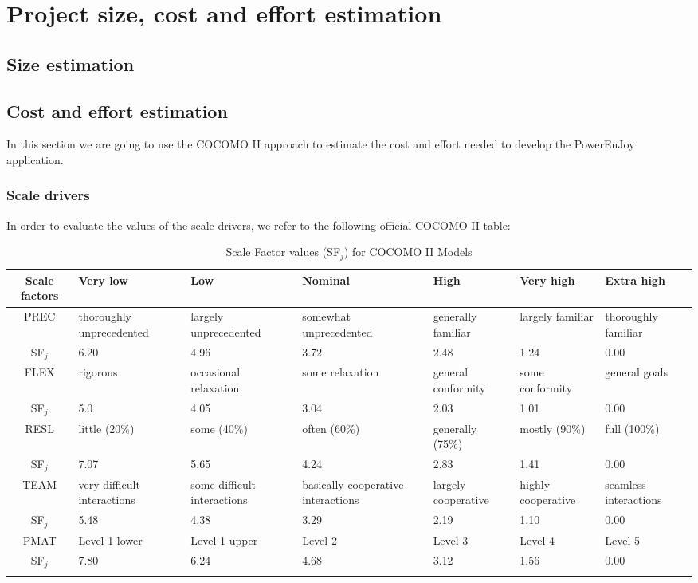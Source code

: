 \chapter{Project size, cost and effort estimation}

\section{Size estimation}

\section{Cost and effort estimation}
In this section we are going to use the COCOMO II approach to estimate the
cost and effort needed to develop the PowerEnJoy application.

\subsection{Scale drivers}
In order to evaluate the values of the scale drivers, we refer to the following official COCOMO II table:

\begingroup
\captionsetup{skip=10pt}
\setlength{\LTleft}{-1.7cm plus -1fill}
\setlength{\LTright}{\LTleft}
\vspace*{0.4cm}
\begin{longtable}{|c|p{2cm}|p{2cm}|p{2cm}|p{2cm}|p{2cm}|p{2cm}|}
	\hline
	Scale factors & Very low & Low & Nominal & High & Very high & Extra high \\
	\hline
	PREC & thoroughly unprecedented & largely unprecedented & somewhat unprecedented & generally familiar & largely familiar & thoroughly familiar \\
	SF\(_j\) & 6.20 & 4.96 & 3.72 & 2.48 & 1.24 & 0.00 \\
	\hline
	FLEX & rigorous & occasional relaxation & some relaxation & general conformity & some conformity & general goals \\
	SF\(_j\) & 5.0 & 4.05 & 3.04 & 2.03 & 1.01 & 0.00 \\
	\hline
	RESL & little (20\%) & some (40\%) & often (60\%) & generally (75\%) & mostly (90\%) & full (100\%) \\
	SF\(_j\) & 7.07 & 5.65 & 4.24 & 2.83 & 1.41 & 0.00 \\
	\hline
	TEAM & very difficult interactions & some difficult interactions & basically cooperative interactions & largely cooperative & highly cooperative & seamless interactions \\
	SF\(_j\) & 5.48 & 4.38 & 3.29 & 2.19 & 1.10 & 0.00 \\
	\hline
	PMAT & Level 1 lower & Level  1 upper & Level 2 & Level 3 & Level 4  & Level 5 \\
	SF\(_j\) & 7.80 & 6.24 & 4.68 & 3.12 & 1.56 & 0.00 \\
	\hline
	
	\caption{Scale Factor values (SF\(_j\)) for COCOMO II Models}
\end{longtable}
\endgroup


